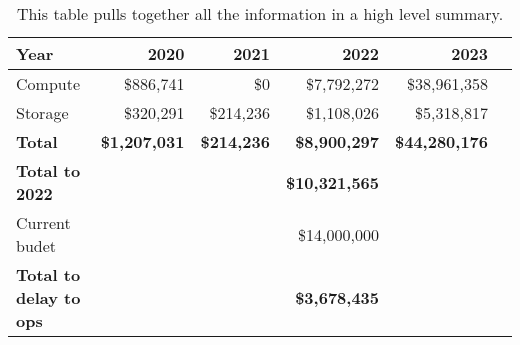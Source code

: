 \tiny \begin{longtable} { |p{}  |r  |r  |r  |r  |r |} 
\caption{This table pulls together all the information in a high level summary. \label{tab:Summary}}\\ 
\hline 
\textbf{Year}&\textbf{2020}&\textbf{2021}&\textbf{2022}&\textbf{2023} \\ \hline
{Compute}&{\$886,741}&{\$0}&{\$7,792,272}&{\$38,961,358} \\ \hline
{Storage}&{\$320,291}&{\$214,236}&{\$1,108,026}&{\$5,318,817} \\ \hline
\textbf{Total}&\textbf{\$1,207,031}&\textbf{\$214,236}&\textbf{\$8,900,297}&\textbf{\$44,280,176} \\ \hline
\textbf{Total to 2022}&\textbf{}&\textbf{}&\textbf{\$10,321,565}& \\ \hline
{Current budet}&{}&{}&{\$14,000,000}& \\ \hline
\textbf{Total to delay to ops }&\textbf{}&\textbf{}&\textbf{\$3,678,435}& \\ \hline
\end{longtable} \normalsize
